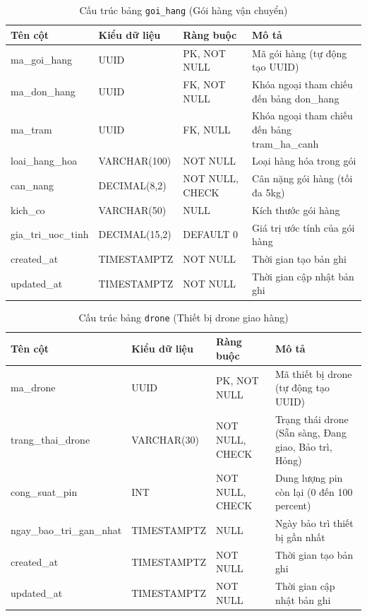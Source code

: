 \begin{table}[H]
  \centering
  \begin{tabularx}{\textwidth}{|l|l|l|>{\raggedright\arraybackslash}X|}
    \hline
    \textbf{Tên cột} & \textbf{Kiểu dữ liệu} & \textbf{Ràng buộc} & \textbf{Mô tả} \\
    \hline
    ma\_goi\_hang        & UUID            & PK, NOT NULL    & Mã gói hàng (tự động tạo UUID) \\ \hline
    ma\_don\_hang        & UUID            & FK, NOT NULL    & Khóa ngoại tham chiếu đến bảng don\_hang \\ \hline
    ma\_tram             & UUID            & FK, NULL        & Khóa ngoại tham chiếu đến bảng tram\_ha\_canh \\ \hline
    loai\_hang\_hoa      & VARCHAR(100)    & NOT NULL        & Loại hàng hóa trong gói \\ \hline
    can\_nang            & DECIMAL(8,2)    & NOT NULL, CHECK & Cân nặng gói hàng (tối đa 5kg) \\ \hline
    kich\_co             & VARCHAR(50)     & NULL            & Kích thước gói hàng \\ \hline
    gia\_tri\_uoc\_tinh  & DECIMAL(15,2)   & DEFAULT 0       & Giá trị ước tính của gói hàng \\ \hline
    created\_at          & TIMESTAMPTZ     & NOT NULL        & Thời gian tạo bản ghi \\ \hline
    updated\_at          & TIMESTAMPTZ     & NOT NULL        & Thời gian cập nhật bản ghi \\
    \hline
  \end{tabularx}
  \caption{Cấu trúc bảng \texttt{goi\_hang} (Gói hàng vận chuyển)}
  \label{tab:db-goi-hang}
\end{table}

\begin{table}[H]
  \centering
  \begin{tabularx}{\textwidth}{|l|l|l|>{\raggedright\arraybackslash}X|}
    \hline
    \textbf{Tên cột} & \textbf{Kiểu dữ liệu} & \textbf{Ràng buộc} & \textbf{Mô tả} \\
    \hline
    ma\_drone            & UUID            & PK, NOT NULL    & Mã thiết bị drone (tự động tạo UUID) \\ \hline
    trang\_thai\_drone   & VARCHAR(30)     & NOT NULL, CHECK & Trạng thái drone (Sẵn sàng, Đang giao, Bảo trì, Hỏng) \\ \hline
    cong\_suat\_pin      & INT             & NOT NULL, CHECK & Dung lượng pin còn lại (0 đến 100 percent) \\ \hline
    ngay\_bao\_tri\_gan\_nhat & TIMESTAMPTZ     & NULL            & Ngày bảo trì thiết bị gần nhất \\ \hline
    created\_at          & TIMESTAMPTZ     & NOT NULL        & Thời gian tạo bản ghi \\ \hline
    updated\_at          & TIMESTAMPTZ     & NOT NULL        & Thời gian cập nhật bản ghi \\
    \hline
  \end{tabularx}
  \caption{Cấu trúc bảng \texttt{drone} (Thiết bị drone giao hàng)}
  \label{tab:db-drone}
\end{table}

